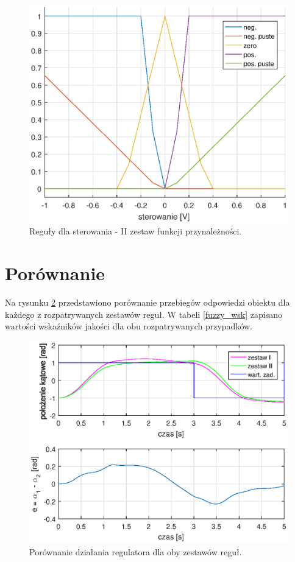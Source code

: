\begin{figure}[h!]
	\centering
	\includegraphics[scale = 0.65]{fig/u_rules.eps}
	\caption		
	{Reguły dla sterowania -  II zestaw funkcji przynależności.}
	\label{u_rules2}
\end{figure}
\FloatBarrier

\section{Porównanie}

Na rysunku \ref{fuzzy_por} przedstawiono porównanie przebiegów odpowiedzi obiektu dla każdego z rozpatrywanych zestawów reguł. W tabeli \ref{fuzzy_wsk} zapisano wartości wska\'zników jakości dla obu rozpatrywanych przypadków.
\begin{figure}[h!]
	\centering
	\includegraphics[scale = 1]{fig/por_fuzzy_sets.eps}
	\caption		
	{Porównanie działania regulatora dla oby zestawów reguł.}
	\label{fuzzy_por}
\end{figure}

